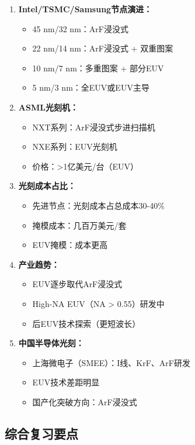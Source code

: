 \documentclass[UTF8,12pt,a4paper]{ctexart}
\begin{document}
\begin{enumerate}
    \item \textbf{Intel/TSMC/Samsung节点演进：}
    \begin{itemize}
        \item 45 nm/32 nm：ArF浸没式
        \item 22 nm/14 nm：ArF浸没式 + 双重图案
        \item 10 nm/7 nm：多重图案 + 部分EUV
        \item 5 nm/3 nm：全EUV或EUV主导
    \end{itemize}
    
    \item \textbf{ASML光刻机：}
    \begin{itemize}
        \item NXT系列：ArF浸没式步进扫描机
        \item NXE系列：EUV光刻机
        \item 价格：>1亿美元/台（EUV）
    \end{itemize}
    
    \item \textbf{光刻成本占比：}
    \begin{itemize}
        \item 先进节点：光刻成本占总成本30-40\%
        \item 掩模成本：几百万美元/套
        \item EUV掩模：成本更高
    \end{itemize}
    
    \item \textbf{产业趋势：}
    \begin{itemize}
        \item EUV逐步取代ArF浸没式
        \item High-NA EUV（NA > 0.55）研发中
        \item 后EUV技术探索（更短波长）
    \end{itemize}
    
    \item \textbf{中国半导体光刻：}
    \begin{itemize}
        \item 上海微电子（SMEE）：I线、KrF、ArF研发
        \item EUV技术差距明显
        \item 国产化突破方向：ArF浸没式
    \end{itemize}
\end{enumerate}

\subsection{综合复习要点}
\end{document}
